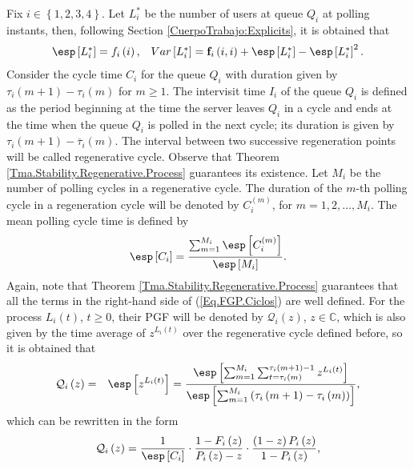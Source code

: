 Fix $i\in\left\{1,2,3,4\right\}$. Let $L_{i}^{*}$ be the number of users at queue $Q_{i}$ at polling instants, then, following Section \ref{CuerpoTrabajo:Explicits}, it is obtained that
\begin{eqnarray}
\begin{array}{cc}
\esp\left[L_{i}^{*}\right]=f_{i}\left(i\right), &
Var\left[L_{i}^{*}\right]=\mathbf{f}_{i}\left(i,i\right)+\esp\left[L_{i}^{*}\right]-\esp\left[L_{i}^{*}\right]^{2}.
\end{array}
\end{eqnarray}
Consider the cycle time $C_{i}$ for the queue $Q_{i}$ with duration given by $\tau_{i}\left(m+1\right)-\tau_{i}\left(m\right)$ for $m\geq1$. The intervisit time $I_{i}$ of the queue $Q_{i}$ is defined as the period beginning at the time the server leaves $Q_{i}$ in a cycle and ends at the time when the queue $Q_{i}$ is polled in the next cycle; its duration is given by $\tau_{i}\left(m+1\right)-\overline{\tau}_{i}\left(m\right)$. The interval between two successive regeneration points will be called regenerative cycle. Observe that Theorem \ref{Tma.Stability.Regenerative.Process} guarantees its existence. Let $M_{i}$ be the number of polling cycles in a regenerative cycle. The duration of the $m$-th polling cycle in a regeneration cycle will be denoted by $C_{i}^{(m)}$, for $m=1,2,\ldots,M_{i}$. The mean polling cycle time is defined by
\begin{equation}\label{Eq.FGP.Ciclos}
\esp\left[C_{i}\right]=\frac{\sum_{m=1}^{M_{i}}\esp\left[C_{i}^{(m)}\right]}{\esp\left[M_{i}\right]}.
\end{equation}
Again, note that Theorem \ref{Tma.Stability.Regenerative.Process} guarantees that all the terms in the right-hand side of (\ref{Eq.FGP.Ciclos}) are well defined.
For the process $L_{i}\left(t\right)$, $t\geq0$, their PGF will be denoted by $\mathcal{Q}_{i}\left(z\right)$, $z\in\mathbb{C}$, which is also given by the time average of $z^{L_{i}\left(t\right)}$ over the regenerative cycle defined before, so it is obtained that
\begin{eqnarray}\label{Eq.Q.any.time}
\mathcal{Q}_{i}\left(z\right)&=&\esp\left[z^{L_{i}\left(t\right)}\right]=\frac{\esp\left[\sum_{m=1}^{M_{i}}\sum_{t=\tau_{i}\left(m\right)}^{\tau_{i}\left(m+1\right)-1}z^{L_{i}\left(t\right)}\right]}{\esp\left[\sum_{m=1}^{M_{i}}\left(\tau_{i}\left(m+1\right)-\tau_{i}\left(m\right)\right)\right]},
\end{eqnarray}
which can be rewritten in the form 
\begin{equation}\label{Eq.Long.Caulquier.Tiempo}
\mathcal{Q}_{i}\left(z\right)=\frac{1}{\esp\left[C_{i}\right]}\cdot\frac{1-F_{i}\left(z\right)}{P_{i}\left(z\right)-z}\cdot\frac{\left(1-z\right)P_{i}\left(z\right)}{1-P_{i}\left(z\right)},
\end{equation}%
